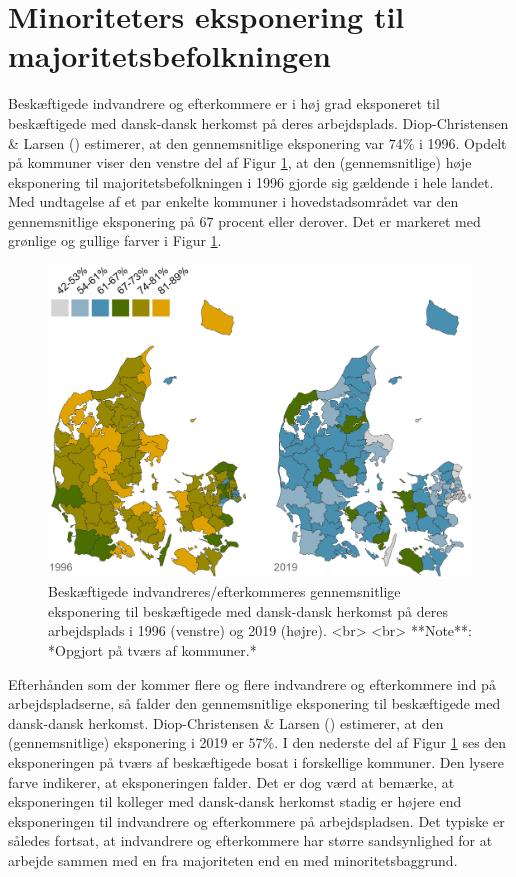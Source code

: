 \documentclass[
]{book}
\begin{document}
\section{Minoriteters eksponering til majoritetsbefolkningen}\label{minoriteters-eksponering-til-majoritetsbefolkningen}

Beskæftigede indvandrere og efterkommere er i høj grad eksponeret til beskæftigede med dansk-dansk herkomst på deres arbejdsplads. Diop-Christensen \& Larsen () estimerer, at den gennemsnitlige eksponering var \(74\%\) i 1996. Opdelt på kommuner viser den venstre del af Figur \ref{fig:fig-5-5}, at den (gennemsnitlige) høje eksponering til majoritetsbefolkningen i 1996 gjorde sig gældende i hele landet. Med undtagelse af et par enkelte kommuner i hovedstadsområdet var den gennemsnitlige eksponering på \(67\) procent eller derover. Det er markeret med grønlige og gullige farver i Figur \ref{fig:fig-5-5}.

\begin{figure}
\includegraphics[width=1\linewidth]{images/Figur_4_4} \caption{Beskæftigede indvandreres/efterkommeres gennemsnitlige eksponering til beskæftigede med dansk-dansk herkomst på deres arbejdsplads i 1996 (venstre) og 2019 (højre). <br> <br> **Note**: *Opgjort på tværs af kommuner.*}\label{fig:fig-5-5}
\end{figure}

Efterhånden som der kommer flere og flere indvandrere og efterkommere ind på arbejdspladserne, så falder den gennemsnitlige eksponering til beskæftigede med dansk-dansk herkomst. Diop-Christensen \& Larsen () estimerer, at den (gennemsnitlige) eksponering i 2019 er \(57\%\). I den nederste del af Figur \ref{fig:fig-5-5} ses den eksponeringen på tværs af beskæftigede bosat i forskellige kommuner. Den lysere farve indikerer, at eksponeringen falder. Det er dog værd at bemærke, at eksponeringen til kolleger med dansk-dansk herkomst stadig er højere end eksponeringen til indvandrere og efterkommere på arbejdspladsen. Det typiske er således fortsat, at indvandrere og efterkommere har større sandsynlighed for at arbejde sammen med en fra majoriteten end en med minoritetsbaggrund.
\end{document}
